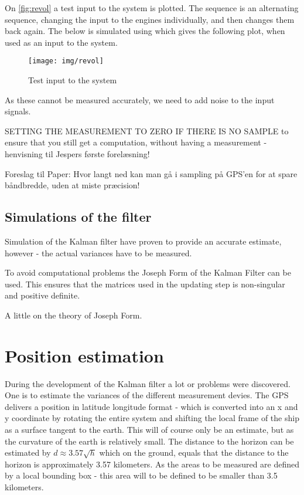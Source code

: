 On \vref{fig:revol} a test input to the system is plotted. The sequence is an alternating sequence, changing the input to the engines individually, and then changes them back again. The below is simulated using \MATLAB which gives the following plot, when used as an input to the system.  
\begin{figure}[htbp]
	\centering
	\texttt{[image: img/revol]}
	\caption{Test input to the system}
	\label{fig:revol}
\end{figure}

As these cannot be measured accurately, we need to add noise to the input signals.

SETTING THE MEASUREMENT TO ZERO IF THERE IS NO SAMPLE to ensure that you still get a computation, without having a measurement - henvisning til Jespers første forelæsning!

Foreslag til Paper: Hvor langt ned kan man gå i sampling på GPS'en for at spare båndbredde, uden at miste præcision!

\subsection{Simulations of the filter}
Simulation of the Kalman filter have proven to provide an accurate estimate, however - the actual variances have to be measured. 

To avoid computational problems the Joseph Form of the Kalman Filter can be used. This ensures that the matrices used in the updating step is non-singular and positive definite. 

A little on the theory of Joseph Form.

\section{Position estimation}
During the development of the Kalman filter a lot or problems were discovered. One is to estimate the variances of the different measurement devies. The GPS delivers a position in latitude longitude format - which is converted into an x and y coordinate by rotating the entire system and shifting the local frame of the ship as a surface tangent to the earth. This will of course only be an estimate, but as the curvature of the earth is relatively small. The distance to the horizon can be estimated by $d \approx 3.57\sqrt{h}$ which on the ground, equals that the distance to the horizon is approximately 3.57 kilometers. As the areas to be measured are defined by a local bounding box - this area will to be defined to be smaller than 3.5 kilometers.

